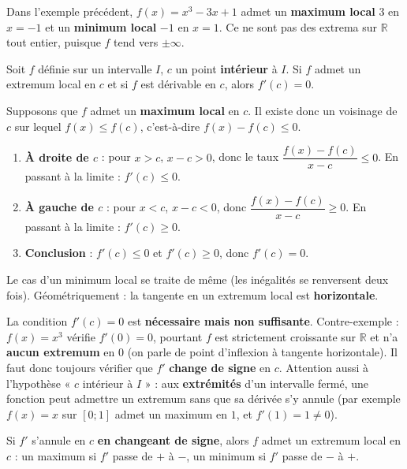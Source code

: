 \documentclass[11pt]{article}
\begin{document}
Dans l'exemple précédent, $f(x)=x^3-3x+1$ admet un \textbf{maximum local} $3$ en $x=-1$ et un \textbf{minimum local} $-1$ en $x=1$. Ce ne sont pas des extrema sur $\mathbb{R}$ tout entier, puisque $f$ tend vers $\pm\infty$.

\begin{propriete}
Soit $f$ définie sur un intervalle $I$, $c$ un point \textbf{intérieur} à $I$. Si $f$ admet un extremum local en $c$ et si $f$ est dérivable en $c$, alors $f'(c)=0$.
\end{propriete}

\begin{experience}
Supposons que $f$ admet un \textbf{maximum local} en $c$. Il existe donc un voisinage de $c$ sur lequel $f(x)\le f(c)$, c'est-à-dire $f(x)-f(c)\le 0$.
\begin{enumerate}
\item \textbf{À droite de $c$} : pour $x>c$, $x-c>0$, donc le taux $\dfrac{f(x)-f(c)}{x-c}\le 0$. En passant à la limite : $f'(c)\le 0$.
\item \textbf{À gauche de $c$} : pour $x<c$, $x-c<0$, donc $\dfrac{f(x)-f(c)}{x-c}\ge 0$. En passant à la limite : $f'(c)\ge 0$.
\item \textbf{Conclusion} : $f'(c)\le 0$ et $f'(c)\ge 0$, donc $f'(c)=0$.
\end{enumerate}
Le cas d'un minimum local se traite de même (les inégalités se renversent deux fois). Géométriquement : la tangente en un extremum local est \textbf{horizontale}.
\end{experience}

\begin{attention}[$f'(c)=0$ ne suffit pas !]
La condition $f'(c)=0$ est \textbf{nécessaire mais non suffisante}. Contre-exemple : $f(x)=x^3$ vérifie $f'(0)=0$, pourtant $f$ est strictement croissante sur $\mathbb{R}$ et n'a \textbf{aucun extremum} en $0$ (on parle de point d'inflexion à tangente horizontale). Il faut donc toujours vérifier que $f'$ \textbf{change de signe} en $c$. Attention aussi à l'hypothèse « $c$ intérieur à $I$ » : aux \textbf{extrémités} d'un intervalle fermé, une fonction peut admettre un extremum sans que sa dérivée s'y annule (par exemple $f(x)=x$ sur $[0;1]$ admet un maximum en $1$, et $f'(1)=1\neq 0$).
\end{attention}

\begin{propriete}
Si $f'$ s'annule en $c$ \textbf{en changeant de signe}, alors $f$ admet un extremum local en $c$ : un maximum si $f'$ passe de $+$ à $-$, un minimum si $f'$ passe de $-$ à $+$.
\end{propriete}
\end{document}
